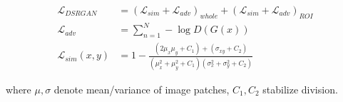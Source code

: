 \documentclass{article}
\begin{document}
\begin{align}
\mathcal{L}_{DSRGAN} &= (\mathcal{L}_{sim} + \mathcal{L}_{adv})_{whole} + (\mathcal{L}_{sim} + \mathcal{L}_{adv})_{ROI} \\
\mathcal{L}_{adv} &= \sum_{n=1}^N -\log D(G(x)) \\
\mathcal{L}_{sim}(x,y) &= 1 - \frac{(2\mu_x\mu_y + C_1) + (\sigma_{xy} + C_2)}{(\mu_x^2 + \mu_y^2 + C_1)(\sigma_x^2 + \sigma_y^2 + C_2)}
\end{align}

where $\mu,\sigma$ denote mean/variance of image patches, $C_1,C_2$ stabilize division.

        
        
    
    
\end{document}
